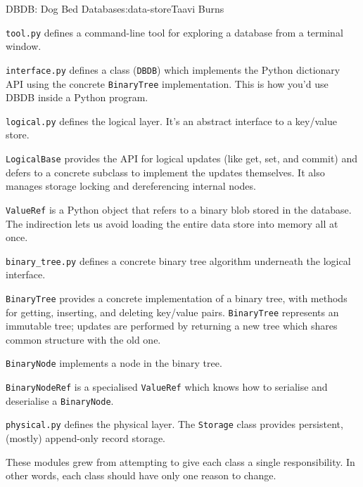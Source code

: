 \begin{aosachapter}{DBDB: Dog Bed Database}{s:data-store}{Taavi Burns}
\begin{aosaitemize}
\item
  \texttt{tool.py} defines a command-line tool for exploring a database
  from a terminal window.
\item
  \texttt{interface.py} defines a class (\texttt{DBDB}) which implements
  the Python dictionary API using the concrete \texttt{BinaryTree}
  implementation. This is how you'd use DBDB inside a Python program.
\item
  \texttt{logical.py} defines the logical layer. It's an abstract
  interface to a key/value store.

  \begin{aosaitemize}
  \item
    \texttt{LogicalBase} provides the API for logical updates (like get,
    set, and commit) and defers to a concrete subclass to implement the
    updates themselves. It also manages storage locking and
    dereferencing internal nodes.
  \item
    \texttt{ValueRef} is a Python object that refers to a binary blob
    stored in the database. The indirection lets us avoid loading the
    entire data store into memory all at once.
  \end{aosaitemize}
\item
  \texttt{binary\_tree.py} defines a concrete binary tree algorithm
  underneath the logical interface.

  \begin{aosaitemize}
  \item
    \texttt{BinaryTree} provides a concrete implementation of a binary
    tree, with methods for getting, inserting, and deleting key/value
    pairs. \texttt{BinaryTree} represents an immutable tree; updates are
    performed by returning a new tree which shares common structure with
    the old one.
  \item
    \texttt{BinaryNode} implements a node in the binary tree.
  \item
    \texttt{BinaryNodeRef} is a specialised \texttt{ValueRef} which
    knows how to serialise and deserialise a \texttt{BinaryNode}.
  \end{aosaitemize}
\item
  \texttt{physical.py} defines the physical layer. The \texttt{Storage}
  class provides persistent, (mostly) append-only record storage.
\end{aosaitemize}

These modules grew from attempting to give each class a single
responsibility. In other words, each class should have only one reason
to change.


\end{aosachapter}
